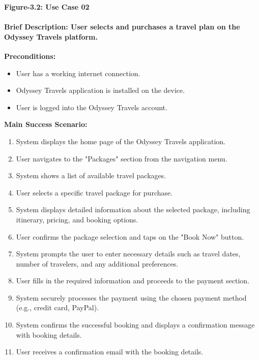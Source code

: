 \documentclass{scrreprt}
\begin{document}
\begin{center}
    \parbox{0.8\textwidth}{ 
        \centering
        \textbf{Figure-3.2: Use Case 02}
    }
\end{center}
\paragraph {\textnormal{Brief Description: 
User selects and purchases a travel plan on the Odyssey Travels platform.\newline
}}
\textbf{Preconditions:}
\begin{itemize}
    \item User has a working internet connection.
    \item Odyssey Travels application is installed on the device.
    \item User is logged into the Odyssey Travels account.
\end{itemize}

\textbf{Main Success Scenario:}
\begin{enumerate}
    \item System displays the home page of the Odyssey Travels application.
    \item User navigates to the "Packages" section from the navigation menu.
    \item System shows a list of available travel packages.
    \item User selects a specific travel package for purchase.
    \item System displays detailed information about the selected package, including itinerary, pricing, and booking options.
    \item User confirms the package selection and taps on the "Book Now" button.
    \item System prompts the user to enter necessary details such as travel dates, number of travelers, and any additional preferences.
    \item User fills in the required information and proceeds to the payment section.
    \item System securely processes the payment using the chosen payment method (e.g., credit card, PayPal).
    \item System confirms the successful booking and displays a confirmation message with booking details.
    \item User receives a confirmation email with the booking details.
\end{enumerate}
\end{document}
